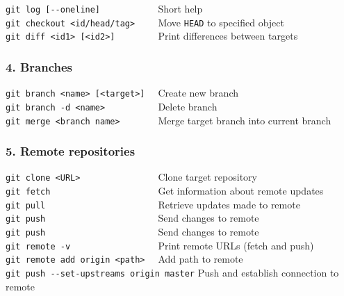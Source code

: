 \documentclass[12pt]{report}
\begin{document}
\verb$git log [--oneline]           $ \hspace*{25pt} Short help\\
\verb$git checkout <id/head/tag>    $ \hspace*{25pt} Move \verb$HEAD$ to specified object \\
\verb$git diff <id1> [<id2>]        $ \hspace*{25pt} Print differences between targets

\subsubsection{4. Branches}

\verb$git branch <name> [<target>]  $ \hspace*{25pt} Create new branch \\
\verb$git branch -d <name>          $ \hspace*{25pt} Delete branch \\
\verb$git merge <branch name>       $ \hspace*{25pt} Merge target branch into current branch

\subsubsection{5. Remote repositories}

\verb$git clone <URL>               $ \hspace*{25pt} Clone target repository \\
\verb$git fetch                     $ \hspace*{25pt} Get information about remote updates \\
\verb$git pull                      $ \hspace*{25pt} Retrieve updates made to remote \\
\verb$git push                      $ \hspace*{25pt} Send changes to remote \\
\verb$git push                      $ \hspace*{25pt} Send changes to remote \\
\verb$git remote -v                 $ \hspace*{25pt} Print remote URLs (fetch and push) \\
\verb$git remote add origin <path>  $ \hspace*{25pt} Add path to remote \\
\verb$git push --set-upstreams origin master$ \hspace*{10pt} Push and establish connection to remote
\end{document}
